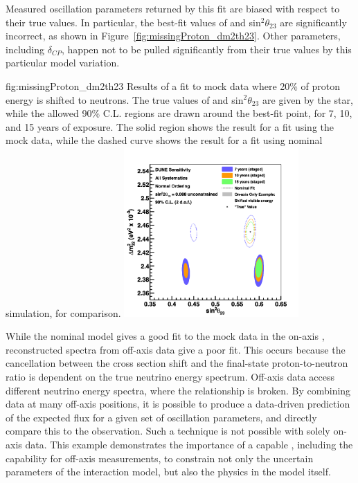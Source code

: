 Measured oscillation parameters returned by this fit are biased with respect to their true values. In particular, the best-fit values of  and sin$^{2}\theta_{23}$ are significantly incorrect, as shown in Figure~\ref{fig:missingProton_dm2th23}. Other parameters, including $\delta_{CP}$, happen not to be pulled significantly from their true values by this particular model variation.

\begin{dunefigure}{fig:missingProton_dm2th23}
{Results of a fit to mock data where 20\% of proton energy is shifted to neutrons. The true values of  and sin$^{2}\theta_{23}$ are given by the star, while the allowed 90\% C.L. regions are drawn around the best-fit point, for 7, 10, and 15 years of exposure. The solid region shows the result for a fit using the mock data, while the dashed curve shows the result for a fit using nominal simulation, for comparison.}
  \includegraphics[width=0.5\textwidth]{graphics/bubbles_enerbybias.png}
\end{dunefigure}

While the nominal model gives a good fit to the mock data in the on-axis , reconstructed spectra from off-axis  data give a poor fit. This occurs because the cancellation between the cross section shift and the final-state proton-to-neutron ratio is dependent on the true neutrino energy spectrum. Off-axis data access different neutrino energy spectra, where the relationship is broken. By combining data at many off-axis positions, it is possible to produce a data-driven prediction of the expected  flux for a given set of oscillation parameters, and directly compare this to the observation. Such a technique is not possible with solely on-axis  data. This example demonstrates the importance of a capable , including the capability for off-axis measurements, to constrain not only the uncertain parameters of the interaction model, but also the physics in the model itself.




